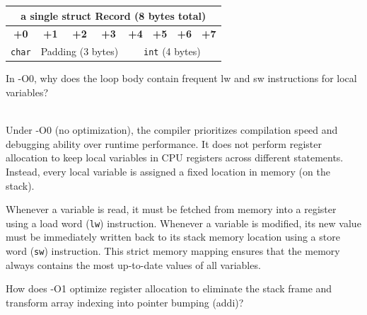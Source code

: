 \documentclass[12pt, a4paper]{article}
\begin{document}
\begin{table}[h]
\centering
\renewcommand{\arraystretch}{1.5}
\begin{tabular}{|c|c|c|c|c|c|c|c|}
\hline
\multicolumn{8}{|c|}{a single struct Record (8 bytes total)} \\
\hline
\textbf{+0} & \textbf{+1} & \textbf{+2} & \textbf{+3} & \textbf{+4} & \textbf{+5} & \textbf{+6} & \textbf{+7} \\
\hline
\texttt{char} & \multicolumn{3}{c|}{Padding (3 bytes)} & \multicolumn{4}{c|}{\texttt{int} (4 bytes)} \\
\hline
\end{tabular}
\end{table}

\noindent\hrulefill

\vspace{0.3cm}
\noindent
In -O0, why does the loop body contain frequent lw and sw instructions for local variables?

\vspace{0.3cm}
\noindent{}\\
Under -O0 (no optimization), the compiler prioritizes compilation speed and debugging ability over runtime performance. It does not perform register allocation to keep local variables in CPU registers across different statements. Instead, every local variable is assigned a fixed location in memory (on the stack). 

Whenever a variable is read, it must be fetched from memory into a register using a load word (\texttt{lw}) instruction. Whenever a variable is modified, its new value must be immediately written back to its stack memory location using a store word (\texttt{sw}) instruction. This strict memory mapping ensures that the memory always contains the most up-to-date values of all variables.

\noindent\hrulefill

\vspace{0.3cm}
\noindent
How does -O1 optimize register allocation to eliminate the stack frame and transform array indexing into pointer bumping (addi)?
\end{document}
